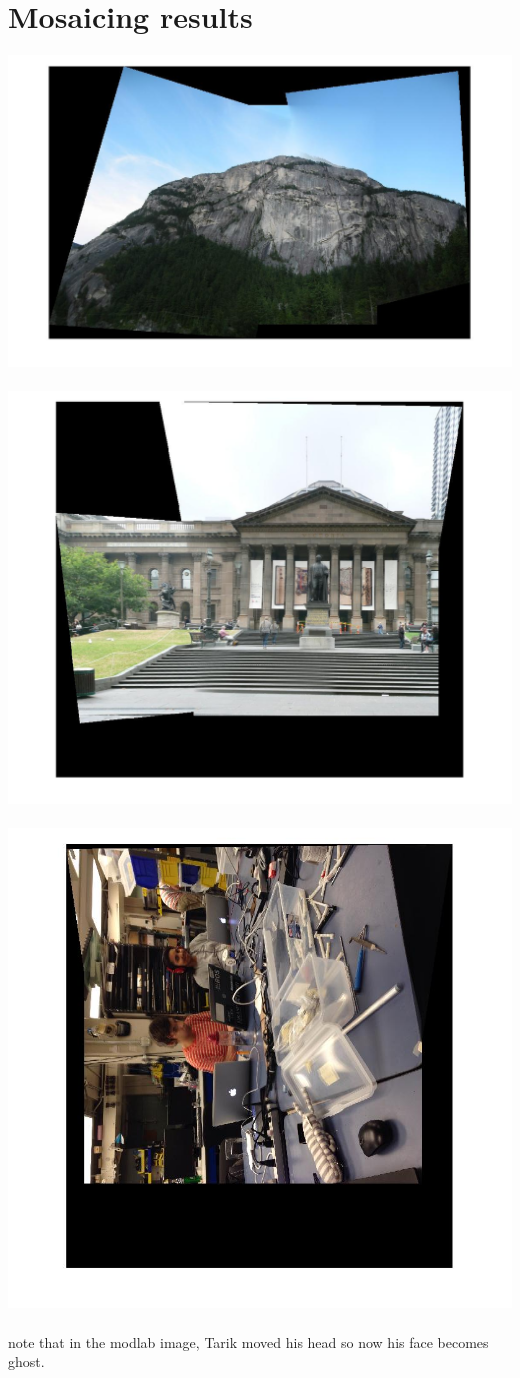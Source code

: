 \documentclass[english]{article}
\begin{document}
\section*{Mosaicing results}
\includegraphics[scale=0.5]{mosaic/mountain.jpg}\\\\
\includegraphics[scale=0.5]{mosaic/rockey.jpg}\\\\
\includegraphics[scale=0.7]{mosaic/modlab.jpg}\\\\
note that in the modlab image, Tarik moved his head so now his face becomes ghost.
\end{document}
